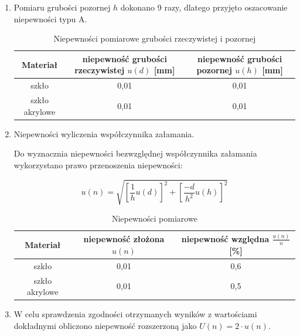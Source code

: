 \documentclass [a4paper,11pt]{article}
\begin{document}
\begin{enumerate}[label=\alph*)]
		\item Pomiaru grubości pozornej $h$ dokonano 9 razy, dlatego przyjęto oszacowanie niepewności typu A.
		
		\begin{table}[!h]
			\begin{center}
				\caption{Niepewności pomiarowe grubości rzeczywistej i pozornej}
				\label{tab:niephd}
				\begin{tabular}{|c|c|c|}
					\hline Materiał & niepewność grubości rzeczywistej $u(d)$ [mm] & niepewność grubości pozornej $u(h)$ [mm] \\
					\hline szkło & 0,01 & 0,01 \\
					\hline szkło akrylowe & 0,01 & 0,01 \\
					\hline 
				\end{tabular} 
			\end{center}
		\end{table}
		
		\item Niepewności wyliczenia współczynnika załamania.
		
		Do wyznacznia niepewności bezwzględnej współczynnika załamania wykorzystano prawo przenoszenia niepewności:
		
		\begin{equation}
		\label{eq:niepewnosczlozona}
		u(n) = \sqrt{\left[ \frac{1}{h}u(d) \right]^2 + \left[ \frac{-d}{h^2}u(h) \right]^2}
		\end{equation}
		\begin{table}[!h]
			\begin{center}
				\caption{Niepewności pomiarowe}
				\label{tab:niepewnosci}
				\begin{tabular}{|c|c|c|}
					\hline Materiał & niepewność złożona $u(n)$ & niepewność względna $\frac{u(n)}{n}$ [\%] \\
					\hline szkło & 0,01 & 0,6 \\
					\hline szkło akrylowe & 0,01 & 0,5 \\
					\hline 
				\end{tabular} 
			\end{center}
		\end{table}
		
		\item W celu sprawdzenia zgodności otrzymanych wyników z wartościami dokładnymi obliczono niepewność
		rozszerzoną jako $U(n) = 2 \cdot u(n)$.
		
		~
		
		~
	\end{enumerate}
	
\end{document}
